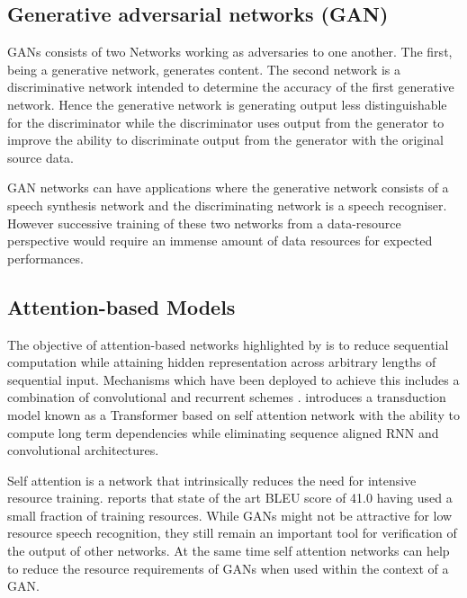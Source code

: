 {\subsection{Generative adversarial networks (GAN)}

GANs consists of two Networks working as adversaries to one another.  The first, being a generative network, generates content.  The second network is a discriminative network intended to determine the accuracy of the first generative network.  Hence the generative network is generating output less distinguishable for the discriminator while the discriminator uses output from the generator to improve the ability to discriminate output from the generator with the original source data.

GAN networks can have applications where the generative network consists of a speech synthesis network and the discriminating network is  a speech recogniser.  However successive training of these two networks from a data-resource perspective would require an immense amount of data resources for expected performances. 

\subsection{Attention-based Models}

The objective of attention-based networks highlighted by  \cite{vaswani2017attention} is to reduce sequential computation while attaining hidden representation across arbitrary lengths of sequential input. Mechanisms which have been deployed to achieve this includes a combination of convolutional and recurrent schemes \citep{kaiser2016can,kalchbrenner2016neural, gehring2017convolutional}. \cite{vaswani2017attention} introduces a transduction model known as a Transformer based on self attention network with the ability to compute long term dependencies while eliminating sequence aligned RNN and convolutional architectures.

Self attention is a network that intrinsically reduces the need for intensive resource training.  \cite{vaswani2017attention} reports that state of the art BLEU score of 41.0 having used a small fraction of training resources.  While GANs might not be attractive for low resource speech recognition, they still remain an important tool for verification of the output of other networks.  At the same time self attention networks can help to reduce the resource requirements of GANs when used within the context of a GAN.

}
